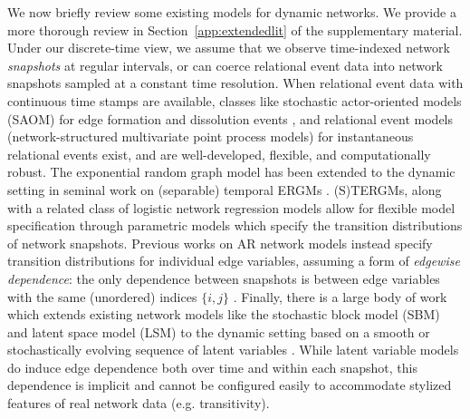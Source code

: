 \documentclass[12pt]{article}
\newcommand{\0}{{\bf 0}}
\begin{document}
We now briefly review some existing models for dynamic networks. We provide a more thorough review in Section~\ref{app:extendedlit} of the supplementary material.
Under our discrete-time view, we assume that we observe time-indexed network {\em snapshots} at regular intervals, or can coerce relational event data into network snapshots sampled at a constant time resolution.
When relational event data with continuous time stamps are available, classes like stochastic actor-oriented models (SAOM) for edge formation and dissolution events \citep{snijders2017stochastic}, and relational event models (network-structured multivariate point process models) for instantaneous relational events \citep[]{PerryWolfe2013,matias2018semiparametric,butts2023relational}
exist, and are well-developed, flexible, and computationally robust.
The exponential random graph model \citep[ERGM,][]{robins2007} has been extended to the dynamic setting in seminal work on (separable) temporal ERGMs \citep[(S)TERGM,][]{hanneke2010,krivitsky2014}. 
(S)TERGMs, along with a related class of logistic network regression models \citep[LNR,][]{almquist2014logistic} allow for flexible model specification through parametric models which specify the transition
distributions of network snapshots.
Previous works on AR network models instead specify transition distributions for individual edge variables, assuming a form of {\em edgewise dependence}: the only dependence between snapshots is between edge variables with the same (unordered) indices $\{i,j\}$ \citep{Jiang2023, Jiang2025}.
Finally, there is a large body of work which extends existing network models like the stochastic block model (SBM) and latent space model (LSM) to the dynamic setting based on a smooth or stochastically evolving sequence of latent
variables \citep{sewell2015latent,Durante2016,matias2017,pensky2019spectral,gallagher2021spectral,suveges2023,zhang2024change}.
While latent variable models do induce edge dependence both over time and within each snapshot, this dependence
is implicit and cannot be configured easily to accommodate stylized features of real network
data (e.g. transitivity).
\end{document}
